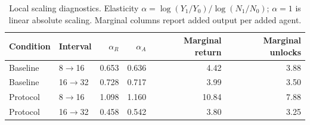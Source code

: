 \begin{table}[t]
\centering
\small
\setlength{\tabcolsep}{5pt}
\begin{tabular}{llrrrr}
\toprule
Condition & Interval & $\alpha_R$ & $\alpha_A$ & Marginal return & Marginal unlocks \\
\midrule
Baseline & 8$\rightarrow$16 & 0.653 & 0.636 & 4.42 & 3.88 \\
Baseline & 16$\rightarrow$32 & 0.728 & 0.717 & 3.99 & 3.50 \\
Protocol & 8$\rightarrow$16 & 1.098 & 1.160 & 10.84 & 7.88 \\
Protocol & 16$\rightarrow$32 & 0.458 & 0.542 & 3.80 & 3.25 \\
\bottomrule
\end{tabular}
\caption{Local scaling diagnostics. Elasticity $\alpha=\log(Y_1/Y_0)/\log(N_1/N_0)$; $\alpha=1$ is linear absolute scaling. Marginal columns report added output per added agent.}
\label{tab:scaling-diagnostics}
\end{table}
